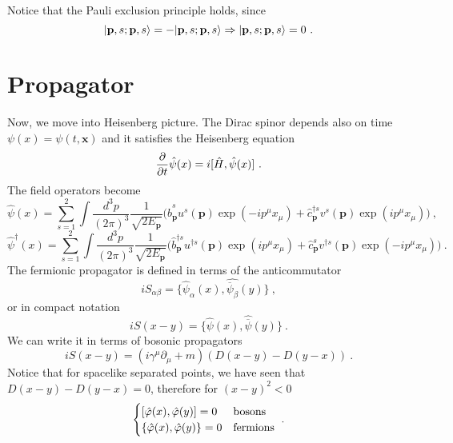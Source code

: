     Notice that the Pauli exclusion principle holds, since 
    \begin{equation*}
        \vert\mathbf p, s; \mathbf p, s\rangle = - \vert\mathbf p, s; \mathbf p, s\rangle  \Rightarrow \vert\mathbf p, s; \mathbf p, s\rangle = 0~.
    \end{equation*}

\section{Propagator} 

    Now, we move into Heisenberg picture. The Dirac spinor depends also on time $\psi(x) = \psi(t, \mathbf x)$ and it satisfies the Heisenberg equation 
    \begin{equation*}
        \frac{\partial}{\partial t} \hat \psi(x) = i [\hat H, \hat \psi (x)] ~.
    \end{equation*}
    The field operators become
    \begin{equation*}
        \hat \psi(x) = \sum_{s=1}^2 \int \frac{d^3 p}{(2\pi)^3} \frac{1}{\sqrt{2 E_{\mathbf p}}} \Big (\hat b_{\mathbf p}^s u^s (\mathbf p) \exp(- i p^\mu x_\mu ) + \hat c_{\mathbf p}^{\dagger s} v^s (\mathbf p) \exp(i p^\mu x_\mu ) \Big) ~, 
    \end{equation*}
    \begin{equation*}
        \hat \psi^\dagger(x) = \sum_{s=1}^2 \int \frac{d^3 p}{(2\pi)^3} \frac{1}{\sqrt{2 E_{\mathbf p}}} \Big (\hat b_{\mathbf p}^{\dagger s} u^{\dagger s} (\mathbf p) \exp(i p^\mu x_\mu ) + \hat c_{\mathbf p}^{s} v^{\dagger s} (\mathbf p) \exp(- i p^\mu x_\mu ) \Big) ~.
    \end{equation*} 
    The fermionic propagator is defined in terms of the anticommutator
    \begin{equation*}
        i S_{\alpha\beta} = \{\hat \psi_\alpha (x), \hat{ \overline \psi_\beta} (y)\} ~,
    \end{equation*}
    or in compact notation 
    \begin{equation*}
        i S(x - y) = \{\hat \psi (x), \hat{\overline \psi}(y)\} ~.
    \end{equation*}
    We can write it in terms of bosonic propagators 
    \begin{equation*}
        i S(x - y) = (i \gamma^\mu \partial_\mu + m) (D(x-y) - D(y-x)) ~.
    \end{equation*}
    Notice that for spacelike separated points, we have seen that $D(x-y) - D(y-x) = 0$, therefore for $(x-y)^2 < 0$
    \begin{equation*}
        \begin{cases}
            [\hat \varphi (x), \hat \varphi (y)] = 0 & \textnormal{bosons} \\
            \{\hat \varphi (x), \hat \varphi (y)\} = 0 & \textnormal{fermions} \\
        \end{cases} ~.
    \end{equation*}

